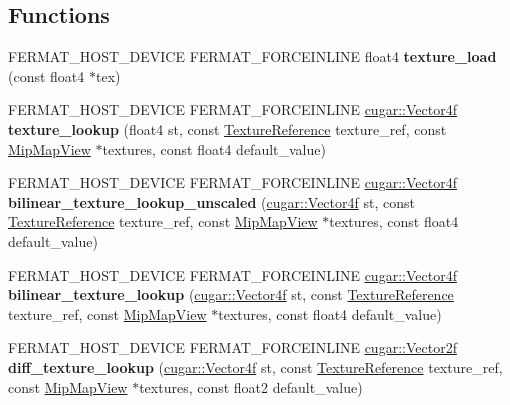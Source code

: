 \subsection*{Functions}
\begin{DoxyCompactItemize}
\item 
\mbox{\label{group___textures_module_ga87c0af527c07361181b2af404b384b82}} 
F\+E\+R\+M\+A\+T\+\_\+\+H\+O\+S\+T\+\_\+\+D\+E\+V\+I\+CE F\+E\+R\+M\+A\+T\+\_\+\+F\+O\+R\+C\+E\+I\+N\+L\+I\+NE float4 {\bfseries texture\+\_\+load} (const float4 $\ast$tex)
\item 
\mbox{\label{group___textures_module_ga80c6b2d36a2a58dd91a11fff93f40937}} 
F\+E\+R\+M\+A\+T\+\_\+\+H\+O\+S\+T\+\_\+\+D\+E\+V\+I\+CE F\+E\+R\+M\+A\+T\+\_\+\+F\+O\+R\+C\+E\+I\+N\+L\+I\+NE \hyperlink{structcugar_1_1_vector}{cugar\+::\+Vector4f} {\bfseries texture\+\_\+lookup} (float4 st, const \hyperlink{struct_texture_reference}{Texture\+Reference} texture\+\_\+ref, const \hyperlink{struct_mip_map_view}{Mip\+Map\+View} $\ast$textures, const float4 default\+\_\+value)
\item 
\mbox{\label{group___textures_module_gac41ff3200f14118ea951d1d26f5e1421}} 
F\+E\+R\+M\+A\+T\+\_\+\+H\+O\+S\+T\+\_\+\+D\+E\+V\+I\+CE F\+E\+R\+M\+A\+T\+\_\+\+F\+O\+R\+C\+E\+I\+N\+L\+I\+NE \hyperlink{structcugar_1_1_vector}{cugar\+::\+Vector4f} {\bfseries bilinear\+\_\+texture\+\_\+lookup\+\_\+unscaled} (\hyperlink{structcugar_1_1_vector}{cugar\+::\+Vector4f} st, const \hyperlink{struct_texture_reference}{Texture\+Reference} texture\+\_\+ref, const \hyperlink{struct_mip_map_view}{Mip\+Map\+View} $\ast$textures, const float4 default\+\_\+value)
\item 
\mbox{\label{group___textures_module_gadeb88db4f9ae0a87f98ec8acec9a54b5}} 
F\+E\+R\+M\+A\+T\+\_\+\+H\+O\+S\+T\+\_\+\+D\+E\+V\+I\+CE F\+E\+R\+M\+A\+T\+\_\+\+F\+O\+R\+C\+E\+I\+N\+L\+I\+NE \hyperlink{structcugar_1_1_vector}{cugar\+::\+Vector4f} {\bfseries bilinear\+\_\+texture\+\_\+lookup} (\hyperlink{structcugar_1_1_vector}{cugar\+::\+Vector4f} st, const \hyperlink{struct_texture_reference}{Texture\+Reference} texture\+\_\+ref, const \hyperlink{struct_mip_map_view}{Mip\+Map\+View} $\ast$textures, const float4 default\+\_\+value)
\item 
\mbox{\label{group___textures_module_gabf9307a5d5d23eeb4fc135d882b1e0a5}} 
F\+E\+R\+M\+A\+T\+\_\+\+H\+O\+S\+T\+\_\+\+D\+E\+V\+I\+CE F\+E\+R\+M\+A\+T\+\_\+\+F\+O\+R\+C\+E\+I\+N\+L\+I\+NE \hyperlink{structcugar_1_1_vector}{cugar\+::\+Vector2f} {\bfseries diff\+\_\+texture\+\_\+lookup} (\hyperlink{structcugar_1_1_vector}{cugar\+::\+Vector4f} st, const \hyperlink{struct_texture_reference}{Texture\+Reference} texture\+\_\+ref, const \hyperlink{struct_mip_map_view}{Mip\+Map\+View} $\ast$textures, const float2 default\+\_\+value)
\end{DoxyCompactItemize}
